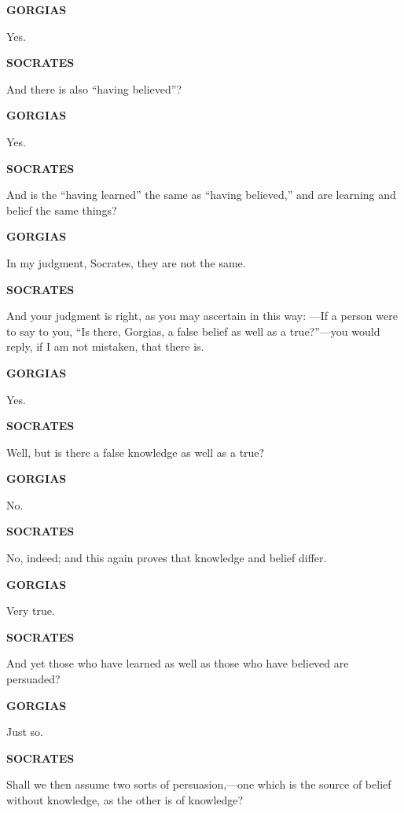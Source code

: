 \documentclass[11pt,letter]{article}
\begin{document}
\par \textbf{GORGIAS}
\par   Yes.

\par \textbf{SOCRATES}
\par   And there is also “having believed”?

\par \textbf{GORGIAS}
\par   Yes.

\par \textbf{SOCRATES}
\par   And is the “having learned” the same as “having believed,” and are learning and belief the same things?

\par \textbf{GORGIAS}
\par   In my judgment, Socrates, they are not the same.

\par \textbf{SOCRATES}
\par   And your judgment is right, as you may ascertain in this way: —If a person were to say to you, “Is there, Gorgias, a false belief as well as a true?”—you would reply, if I am not mistaken, that there is.

\par \textbf{GORGIAS}
\par   Yes.

\par \textbf{SOCRATES}
\par   Well, but is there a false knowledge as well as a true?

\par \textbf{GORGIAS}
\par   No.

\par \textbf{SOCRATES}
\par   No, indeed; and this again proves that knowledge and belief differ.

\par \textbf{GORGIAS}
\par   Very true.

\par \textbf{SOCRATES}
\par   And yet those who have learned as well as those who have believed are persuaded?

\par \textbf{GORGIAS}
\par   Just so.

\par \textbf{SOCRATES}
\par   Shall we then assume two sorts of persuasion,—one which is the source of belief without knowledge, as the other is of knowledge?
\end{document}
